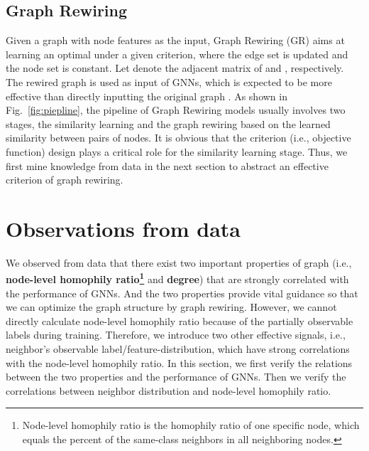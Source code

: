 \documentclass[sigconf]{acmart}
\begin{document}
	\subsection{Graph Rewiring}
	Given a graph  with node features  as the input, Graph Rewiring (GR) aims at learning an optimal  under a given criterion, where the edge set is updated and the node set is constant. Let  denote the adjacent matrix of  and , respectively. The rewired graph  is used as input of GNNs, which is expected to be more effective than directly inputting the original graph . As shown in Fig.~\ref{fig:piepline}, the pipeline of Graph Rewiring models usually involves two stages, the similarity learning and the graph rewiring based on the learned similarity between pairs of nodes. It is obvious that the criterion (i.e., objective function) design plays a critical role for the similarity learning stage. Thus, we first mine knowledge from data in the next section to abstract an effective criterion of graph rewiring. 	\section{Observations from data}
	\label{section:findings}
    We observed from data that there exist two important properties of graph (i.e., \textbf{node-level homophily ratio\footnote{Node-level homophily ratio is the homophily ratio of one specific node, which equals the percent of the same-class neighbors in all neighboring nodes.}} and \textbf{degree}) that are strongly correlated with the performance of GNNs. And the two properties provide vital guidance so that we can optimize the graph structure by graph rewiring. However, we cannot directly calculate node-level homophily ratio because of the partially observable labels during training. Therefore, we introduce two other effective signals, i.e., neighbor's observable label/feature-distribution, which have strong correlations with the node-level homophily ratio. In this section, we first verify the relations between the two properties and the performance of GNNs. Then we verify the correlations between neighbor distribution and node-level homophily ratio.
\end{document}
